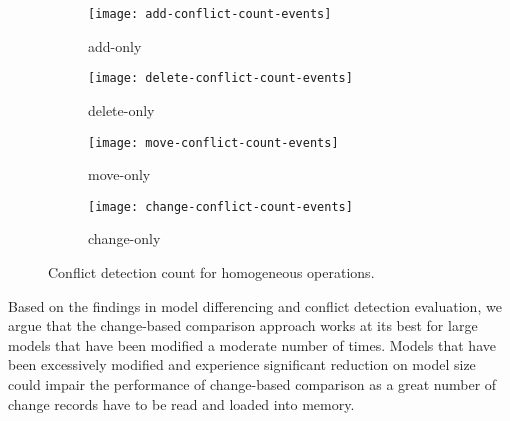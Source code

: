 \begin{figure*}[ht]
    \centering
    \begin{subfigure}[t]{0.245\linewidth}
        \texttt{[image: add-conflict-count-events]}
        \caption{add-only}
        \label{fig:add-conflict-count-events}
    \end{subfigure}
    \hfill
    \begin{subfigure}[t]{0.245\linewidth}
        \texttt{[image: delete-conflict-count-events]}
        \caption{delete-only}
        \label{fig:delete-conflict-count-events}
    \end{subfigure}
    \hfill
    \begin{subfigure}[t]{0.245\linewidth}
        \texttt{[image: move-conflict-count-events]}
        \caption{move-only}
        \label{fig:move-conflict-count-events}
    \end{subfigure}
    \hfill
    \begin{subfigure}[t]{0.245\linewidth}
        \texttt{[image: change-conflict-count-events]}
        \caption{change-only}
        \label{fig:change-conflict-count-events}
    \end{subfigure}
    \caption{Conflict detection count for homogeneous operations.}
    \label{fig:homgeneous_operation_count_events}
\end{figure*}

Based on the findings in model differencing and conflict detection evaluation, we argue that the change-based comparison approach works at its best for large models that have been modified a moderate number of times. Models that have been excessively modified and experience significant reduction on model size could impair the performance of change-based comparison as a great number of change records have to be read and loaded into memory. 

